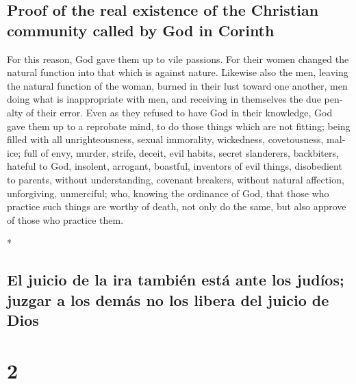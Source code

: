 \begin{paracol}{2}
\begin{otherlanguage}{english}
\hypertarget{proof-of-the-real-existence-of-the-christian-community-called-by-god-in-corinth}{%
\subsection{Proof of the real existence of the Christian community
called by God in
Corinth}\label{proof-of-the-real-existence-of-the-christian-community-called-by-god-in-corinth}}

 For this reason, God gave them up to vile passions. For
their women changed the natural function into that which is against
nature.  Likewise also the men, leaving the natural
function of the woman, burned in their lust toward one another, men
doing what is inappropriate with men, and receiving in themselves the
due penalty of their error.  Even as they refused to have
God in their knowledge, God gave them up to a reprobate mind, to do
those things which are not fitting;  being filled with
all unrighteousness, sexual immorality, wickedness, covetousness,
malice; full of envy, murder, strife, deceit, evil habits, secret
slanderers,  backbiters, hateful to God, insolent,
arrogant, boastful, inventors of evil things, disobedient to parents,
 without understanding, covenant breakers, without
natural affection, unforgiving, unmerciful;  who, knowing
the ordinance of God, that those who practice such things are worthy of
death, not only do the same, but also approve of those who practice
them.

\end{otherlanguage}

\switchcolumn[0]*

\hypertarget{el-juicio-de-la-ira-tambiuxe9n-estuxe1-ante-los-juduxedos-juzgar-a-los-demuxe1s-no-los-libera-del-juicio-de-dios}{%
\subsection{El juicio de la ira también está ante los judíos; juzgar a
los demás no los libera del juicio de
Dios}\label{el-juicio-de-la-ira-tambiuxe9n-estuxe1-ante-los-juduxedos-juzgar-a-los-demuxe1s-no-los-libera-del-juicio-de-dios}}

\hypertarget{section-2}{%
\section{2}\label{section-2}}


\end{paracol}
